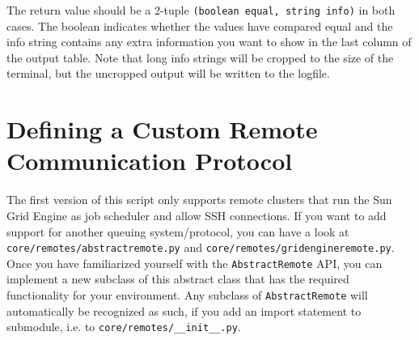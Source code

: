 \documentclass[a4paper,12pt]{scrartcl}
\begin{document}
The return value should be a 2-tuple \texttt{(boolean equal, string info)} in both cases. The boolean indicates
whether the values have compared equal and the info string contains any extra information you want to show in the
last column of the output table. Note that long info strings will be cropped to the size of the terminal, but the
uncropped output will be written to the logfile.

\section{Defining a Custom Remote Communication Protocol}
The first version of this script only supports remote clusters that run the Sun Grid Engine as job scheduler and
allow SSH connections. If you want to add support for another queuing system/protocol, you can have a look at
\texttt{core/remotes/abstractremote.py} and \texttt{core/remotes/gridengineremote.py}. Once you have familiarized
yourself with the \texttt{AbstractRemote} API, you can implement a new subclass of this abstract class that has the
required functionality for your environment. Any subclass of \texttt{AbstractRemote} will automatically be recognized
as such, if you add an import statement to submodule, i.e. to \texttt{core/remotes/\_\_init\_\_.py}.
\end{document}
